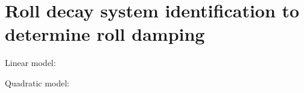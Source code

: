 \section{Roll decay system identification to determine roll damping}
Linear model:
 
Quadratic model:
 